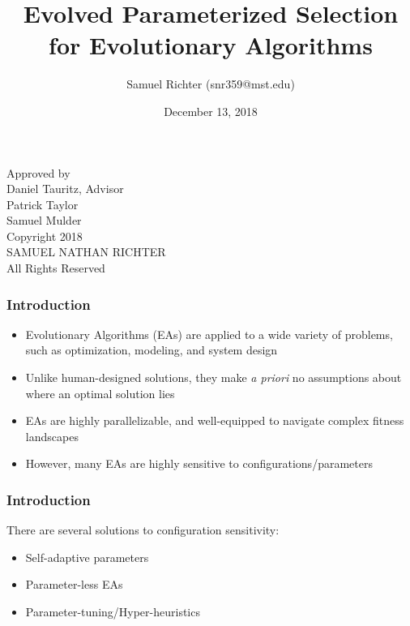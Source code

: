 \documentclass{beamer}
\title[Evolved Parameterized Selection for Evolutionary Algorithms]
{Evolved Parameterized Selection for Evolutionary Algorithms}
\author[Richter, Samuel] %
{Samuel Richter (snr359@mst.edu)}
\institute %
{
  Natural Computation Laboratory\\
  Department of Computer Science\\
  Missouri University of Science and Technology\\
  Rolla, Missouri 65409
}
\date{December 13, 2018}
\begin{document}
 
	\frame{\titlepage}
	
	\begin{frame}
	\small
	\centering
		Approved by\\
		\vspace{0.3in}
		Daniel Tauritz, Advisor\\
		Patrick Taylor\\
		Samuel Mulder\\
		\vspace{0.3in}
		Copyright 2018\\
		SAMUEL NATHAN RICHTER\\
		All Rights Reserved\\
	\end{frame}

	
	\begin{frame}
		\frametitle{Introduction}
		
		\begin{itemize}
			\item<1-|alert@1> Evolutionary Algorithms (EAs) are applied to a wide variety of problems, such as optimization, modeling, and system design
			\item<2-|alert@2> Unlike human-designed solutions, they make \textit{a priori} no assumptions about where an optimal solution lies
			\item<3-|alert@3> EAs are highly parallelizable, and well-equipped to navigate complex fitness landscapes
			\item<4-|alert@4> However, many EAs are highly sensitive to configurations/parameters 			 
		\end{itemize}
	\end{frame}
	
	\begin{frame}
		\frametitle{Introduction}
		There are several solutions to configuration sensitivity:
		\begin{itemize}
			\item<2-|alert@2> Self-adaptive parameters
			\item<3-|alert@3> Parameter-less EAs
			\item<4-|alert@4> Parameter-tuning/Hyper-heuristics
		\end{itemize}
	\end{frame}	
	
\end{document}
